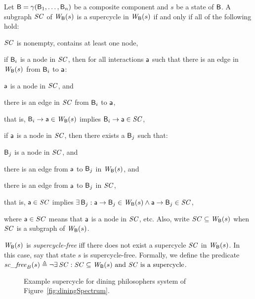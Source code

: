 \bd[Supercycle]
\label{def:supercycle}
Let $\mathsf{B} = \gamma(\mathsf{B}_1,\dots,\mathsf{B}_n)$ be a composite component and $s$ be a state of $\mathsf{B}$.
A subgraph $\mathit{SC}$ of $\mathit{W}_{\mathsf{B}}({s})$ is a supercycle in $\mathit{W}_{\mathsf{B}}({s})$ if and only if all of the following hold:
\begin{nlst1}
   \item \label{def:supercycle.nonempty} $\mathit{SC}$ is nonempty, \ie contains at least one node,

   \item \label{def:supercycle.component-blocked} if $\mathsf{B}_i$ is a node in $\mathit{SC}$, then for all interactions $\mathsf{a}$ such that
there is an edge in $\mathit{W}_{\mathsf{B}}({s})$ from $\mathsf{B}_i$ to $\mathsf{a}$:
      \begin{nlst2}
      \item $\mathsf{a}$ is a node in $\mathit{SC}$, and 
      \item there is an edge in $\mathit{SC}$ from $\mathsf{B}_i$ to $\mathsf{a}$,
      \end{nlst2}
that is, $\mathsf{B}_i \rightarrow \mathsf{a} \in \mathit{W}_{\mathsf{B}}({s})$ implies $\mathsf{B}_i \rightarrow \mathsf{a} \in \mathit{SC}$,

   \item \label{def:supercycle.action-blocked}  
if $\mathsf{a}$ is a node in $\mathit{SC}$, then there exists a $\mathsf{B}_j$ such that:
      \begin{nlst2}
      \item $\mathsf{B}_j$  is a node in $\mathit{SC}$, and
      \item there is an edge from $\mathsf{a}$ to $\mathsf{B}_j$ in $\mathit{W}_{\mathsf{B}}({s})$, and
      \item there is an edge from $\mathsf{a}$ to $\mathsf{B}_j$ in $\mathit{SC}$,
      \end{nlst2}
that is, $\mathsf{a} \in \mathit{SC}$ implies $\exists\, \mathsf{B}_j : \mathsf{a} \rightarrow \mathsf{B}_j \in \mathit{W}_{\mathsf{B}}({s}) \land \mathsf{a} \rightarrow \mathsf{B}_j \in \mathit{SC}$,

\end{nlst1}
\ed
where $\mathsf{a} \in SC$ means that $\mathsf{a}$ is a node in $\mathit{SC}$, etc. 
Also, write $SC \subseteq \mathit{W}_{\mathsf{B}}({s})$ when $\mathit{SC}$ is a subgraph of $\mathit{W}_{\mathsf{B}}({s})$.


\label{def:supercycle-free}
$\mathit{W}_{\mathsf{B}}({s})$ is \emph{supercycle-free} iff 
there does not exist a supercycle $\mathit{SC}$ in $\mathit{W}_{\mathsf{B}}({s})$. 
In this case, say that state $s$ is supercycle-free.
Formally, we define the predicate 
    $\scf{B}{s} \df \neg \ex \SC: \SC \sub \wfg{\B}{s} \ \mbox{and $\SC$ is a supercycle}$. 
\ed

\begin{figure*}[ht]
  \begin{center}
   \scalebox{0.4}{}
   \caption{Example supercycle for dining philosophers system of Figure~\ref{fig:diningSpectrum}.}
   \label{fig:sc}
  \end{center}
\end{figure*}


